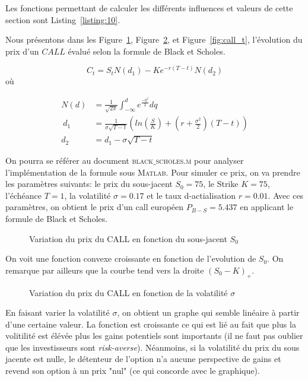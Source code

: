 Les fonctions permettant de calculer les différents influences et valeurs de cette section sont Listing~\ref{listing:10}.

Nous présentons dans les Figure~\ref{fig:call_s}, Figure~\ref{fig:call_sigma}, et Figure~\ref{fig:call_t}, l'évolution du prix d'un $CALL$ évalué selon la formule de Black et Scholes.

\begin{equation} C_{t}=S_{t}N(d_{1})-Ke^{-r(T-t)}N(d_{2})\end{equation}
où

\begin{align*}
N(d) &= \frac{1}{\sqrt{2\pi}}\int_{-\infty}^{d} {e^{\frac{-q^{2}}{2}} dq}\\\ 
d_1 &=\frac{1}{\sigma\sqrt{T-t}}(ln(\frac{S}{K})+(r+\frac{\sigma^{2}}{2})(T-t))\\
d_2 &=d_1-\sigma\sqrt{T-t}
\end{align*}

 On pourra se référer au document \textsc{black$\_$scholes.m} pour analyser l'implémentation de la formule sous \textsc{Matlab}. Pour simuler ce prix, on va prendre les paramètres suivants: le prix du sous-jacent $S_0=75$, le Strike $K=75$, l'échéance $T=1$, la volatilité $\sigma = 0.17$ et le taux d-actialisation $r=0.01$.
Avec ces paramètres, on obtient le prix d'un call européen $P_{B-S}=5.437$ en applicant le formule de Black et Scholes. 

\vfill

\begin{figure}[H]
\centering

\caption{Variation du prix du CALL en fonction du sous-jacent $S_0$}
\label{fig:call_s}
\end{figure}

On voit une fonction convexe croissante en fonction de l'evolution de $S_{0}$. On remarque par ailleurs que la courbe tend vers la droite  $(S_{0}-K)_+$.

\vfill

\newpage

\begin{figure}[H]
\centering

\caption{Variation du prix du CALL en fonction de la volatilité $\sigma$}
\label{fig:call_sigma}
\end{figure}

En faisant varier la volatilité $\sigma$, on obtient un graphe qui semble linéaire à partir d'une certaine valeur. La fonction est croissante ce qui est lié au fait que plus la volitilité est élévée plus les gains potentiels sont importants (il ne faut pas oublier que les investisseurs sont {\slshape risk-averse}). Néanmoins, si la volatilité du prix du sous jacente est nulle, le détenteur de l'option n'a aucune perspective de gains et revend son option à un prix "nul" (ce qui concorde avec le graphique).  

